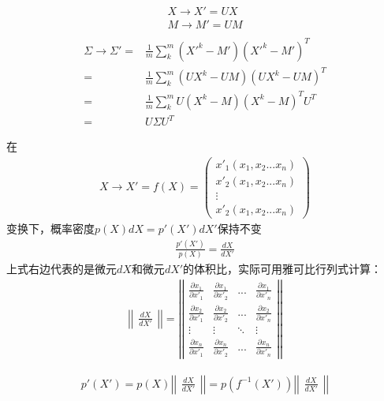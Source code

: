 \begin{gather}
    X\rightarrow X'=UX\\
    M\rightarrow M'=UM\\
\end{gather}
\begin{align}
    \Sigma \rightarrow \Sigma'
    =& \frac{1}{m} \sum_{k}^{m} (X'^{k}-M')(X'^{k}-M')^{T}\\
    =& \frac{1}{m} \sum_{k}^{m} (UX^{k}-UM)(UX^{k}-UM)^{T}\\
    =& \frac{1}{m} \sum_{k}^{m} U(X^{k}-M)(X^{k}-M)^{T}U^{T}\\
    =& U \Sigma U^{T}
\end{align}

在
\begin{gather}
    X\rightarrow X'=f(X) =
    \begin{pmatrix}
        x'_{1}(x_{1},x_{2}...x_{n})\\
        x'_{2}(x_{1},x_{2}...x_{n})\\
        \vdots\\
        x'_{2}(x_{1},x_{2}...x_{n})
    \end{pmatrix}
\end{gather}
变换下，概率密度$p(X)dX = p'(X')dX'$保持不变
\begin{gather}
    \frac{p'(X')}{p(X)}=\frac{dX}{dX'}
\end{gather}
上式右边代表的是微元$dX$和微元$dX'$的体积比，实际可用雅可比行列式计算：
\begin{gather}
    \left | \left |
    \begin{matrix}
        \frac{dX}{dX'}
    \end{matrix}
    \right | \right |
    = \left | \left |
    \begin{matrix}
        \frac{\partial x_{1}}{\partial x'_{1}} & \frac{\partial x_{1}}{\partial x'_{2}} & ... & \frac{\partial x_{1}}{\partial x'_{n}}\\
        \frac{\partial x_{2}}{\partial x'_{1}} & \frac{\partial x_{2}}{\partial x'_{2}} & ... & \frac{\partial x_{2}}{\partial x'_{n}}\\
        \vdots & \vdots & \ddots & \vdots\\
        \frac{\partial x_{n}}{\partial x'_{1}} & \frac{\partial x_{n}}{\partial x'_{2}} & ... & \frac{\partial x_{n}}{\partial x'_{n}}
    \end{matrix}
    \right | \right |
\end{gather}

\begin{gather}
    p'(X') = p(X)
    \left | \left |
    \begin{matrix}
        \frac{dX}{dX'}
    \end{matrix}
    \right | \right |
    = p(f^{-1}(X'))
    \left | \left |
    \begin{matrix}
        \frac{dX}{dX'}
    \end{matrix}
    \right | \right |
\end{gather}

